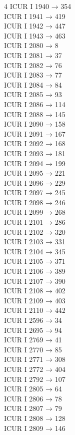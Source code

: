 \begin{multicols}{4}
ICUR I 1940 → 354\\
ICUR I 1941 → 419\\
ICUR I 1942 → 447\\
ICUR I 1943 → 463\\
ICUR I 2080 → 8\\
ICUR I 2081 → 37\\
ICUR I 2082 → 76\\
ICUR I 2083 → 77\\
ICUR I 2084 → 84\\
ICUR I 2085 → 93\\
ICUR I 2086 → 114\\
ICUR I 2088 → 145\\
ICUR I 2090 → 158\\
ICUR I 2091 → 167\\
ICUR I 2092 → 168\\
ICUR I 2093 → 181\\
ICUR I 2094 → 199\\
ICUR I 2095 → 221\\
ICUR I 2096 → 229\\
ICUR I 2097 → 245\\
ICUR I 2098 → 246\\
ICUR I 2099 → 268\\
ICUR I 2101 → 286\\
ICUR I 2102 → 320\\
ICUR I 2103 → 331\\
ICUR I 2104 → 345\\
ICUR I 2105 → 371\\
ICUR I 2106 → 389\\
ICUR I 2107 → 390\\
ICUR I 2108 → 402\\
ICUR I 2109 → 403\\
ICUR I 2110 → 442\\
ICUR I 2596 → 34\\
ICUR I 2695 → 94\\
ICUR I 2769 → 41\\
ICUR I 2770 → 85\\
ICUR I 2771 → 308\\
ICUR I 2772 → 404\\
ICUR I 2792 → 107\\
ICUR I 2805 → 64\\
ICUR I 2806 → 78\\
ICUR I 2807 → 79\\
ICUR I 2808 → 128\\
ICUR I 2809 → 146\\

\end{multicols}
